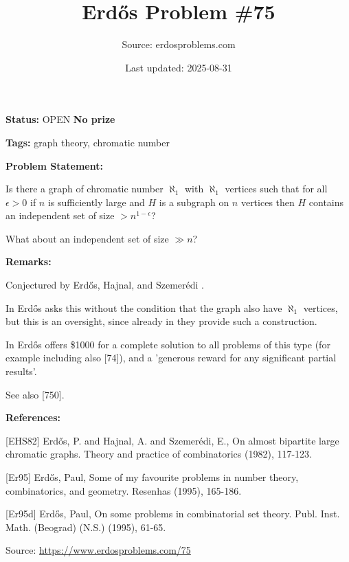 \documentclass{article}
\title{Erd\H{o}s Problem \#75}
\date{Last updated: 2025-08-31}
\author{Source: erdosproblems.com}
\begin{document}
\maketitle

\noindent\textbf{Status:} OPEN \quad \textbf{No prize}

\noindent\textbf{Tags:} graph theory, chromatic number

\medskip
\noindent\textbf{Problem Statement:}

Is there a graph of chromatic number $\aleph_1$ with $\aleph_1$ vertices such that for all $\epsilon>0$ if $n$ is sufficiently large and $H$ is a subgraph on $n$ vertices then $H$ contains an independent set of size $>n^{1-\epsilon}$? 

What about an independent set of size $\gg n$?

\bigskip
\noindent\textbf{Remarks:}

Conjectured by Erdős, Hajnal, and Szemerédi \cite{EHS82}.

In \cite{Er95} Erd\H{o}s asks this without the condition that the graph also have $\aleph_1$ vertices, but this is an oversight, since already in \cite{EHS82} they provide such a construction.

In \cite{Er95d} Erd\H{o}s offers \$1000 for a complete solution to all problems of this type (for example including also [74]), and a 'generous reward for any significant partial results'.

See also [750].

\bigskip
\noindent\textbf{References:}

[EHS82] Erd\H{o}s, P. and Hajnal, A. and Szemer\'{e}di, E., On almost bipartite large chromatic graphs. Theory and practice of combinatorics (1982), 117-123.
 
 [Er95] Erd\H{o}s, Paul, Some of my favourite problems in number theory, combinatorics, and geometry. Resenhas (1995), 165-186.
 
 [Er95d] Erd\H{o}s, Paul, On some problems in combinatorial set theory. Publ. Inst. Math. (Beograd) (N.S.) (1995), 61-65.

\bigskip
\noindent\small{Source: \url{https://www.erdosproblems.com/75}}
\end{document}
